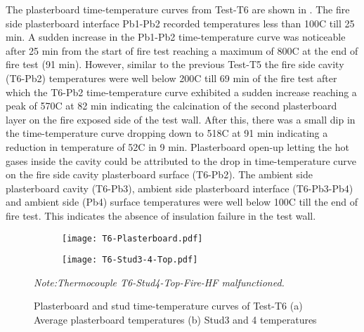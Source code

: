 The plasterboard time-temperature curves from Test-T6 are shown in . The fire side plasterboard interface Pb1-Pb2 recorded temperatures less than 100\degree C till 25 min. A sudden increase in the Pb1-Pb2 time-temperature curve was noticeable after 25 min from the start of fire test reaching a maximum of 800\degree C at the end of fire test (91 min). However, similar to the previous Test-T5 the fire side cavity (T6-Pb2) temperatures were well below 200\degree C till 69 min of the fire test after which the T6-Pb2 time-temperature curve exhibited a sudden increase reaching a peak of 570\degree C at 82 min indicating the calcination of the second plasterboard layer on the fire exposed side of the test wall. After this, there was a small dip in the time-temperature curve dropping down to 518\degree C at 91 min indicating a reduction in temperature of 52\degree C in 9 min. Plasterboard open-up letting the hot gases inside the cavity could be attributed to the drop in time-temperature curve on the fire side cavity plasterboard surface (T6-Pb2). The ambient side plasterboard cavity (T6-Pb3), ambient side plasterboard interface (T6-Pb3-Pb4) and ambient side (Pb4) surface temperatures were well below 100\degree C till the end of fire test. This indicates the absence of insulation failure in the test wall.
\begin{figure}[!htbp]
	\centering
	\begin{subfigure}[b]{0.7\textwidth}
		\centering
		\texttt{[image: T6-Plasterboard.pdf]}
		\caption{}
		\label{subfig:T6-Plasterboard}
	\end{subfigure}
	\begin{subfigure}[b]{0.7\textwidth}
		\centering
		\texttt{[image: T6-Stud3-4-Top.pdf]}
		\caption{}
		\label{subfig:T6-Stud3-4-Top}
	\end{subfigure}
	   \caption{Plasterboard and stud time-temperature curves of Test-T6 (a) Average plasterboard temperatures (b) Stud3 and 4 temperatures}
	   \label{fig:T6-PB-Stud}
	   \fontsize{10}{1}\textit{Note:Thermocouple T6-Stud4-Top-Fire-HF malfunctioned.}
\end{figure}

